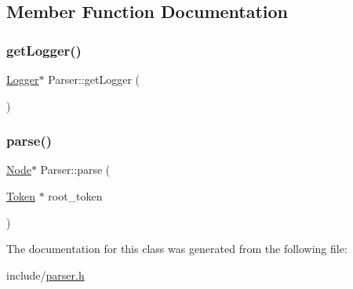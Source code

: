 \subsection{Member Function Documentation}
\mbox{\label{classParser_a87f0d3ea4178cfba8aaf9f898ce899e6}} 
\subsubsection{\texorpdfstring{get\+Logger()}{getLogger()}}
{\footnotesize\ttfamily \hyperlink{classLogger}{Logger}$\ast$ Parser\+::get\+Logger (\begin{DoxyParamCaption}{ }\end{DoxyParamCaption})}

\mbox{\label{classParser_ab6d7f459c011482f94ee185fc4779168}} 
\subsubsection{\texorpdfstring{parse()}{parse()}}
{\footnotesize\ttfamily \hyperlink{classNode}{Node}$\ast$ Parser\+::parse (\begin{DoxyParamCaption}\item[{\hyperlink{classToken}{Token} $\ast$}]{root\+\_\+token }\end{DoxyParamCaption})}



The documentation for this class was generated from the following file\+:\begin{DoxyCompactItemize}
\item 
include/\hyperlink{parser_8h}{parser.\+h}\end{DoxyCompactItemize}
